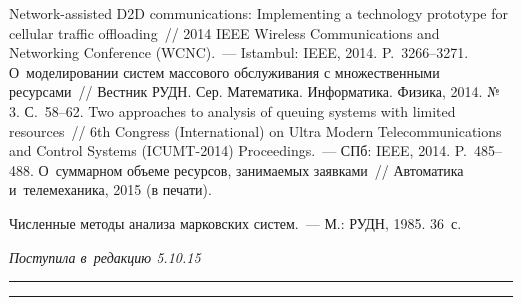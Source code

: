 \begin{multicols}{2}
{{\begin{thebibliography}{9}
Network-assisted D2D communications: Implementing a technology prototype for 
cellular traffic offloading~// 2014 IEEE Wireless Communications and Networking 
Conference (WCNC).~--- Istambul: IEEE, 2014. P.~3266--3271.
 О~моделировании систем массового 
обслуживания с множественными ресурсами~// Вестник РУДН. Сер. 
Математика. Информатика. Физика, 2014. №\,3. С.~58--62.
 Two approaches to analysis of 
queuing systems with limited resources~// 6th Congress (International) on Ultra 
Modern Telecommunications and Control Systems (ICUMT-2014) Proceedings.~--- 
СПб: IEEE, 2014. P.~485--488.
 О~суммарном объеме 
ресурсов, занимаемых заявками~// Автоматика и~телемеханика, 2015 (в печати).

 Численные методы анализа марковских систем.~--- М.: РУДН, 1985. 
36~с.



 \end{thebibliography}

 }
 }

\end{multicols}

\vspace*{-12pt}

\hfill{\small\textit{Поступила в~редакцию 5.10.15}}

\vspace*{4pt}



\hrule

\vspace*{2pt}

\hrule

\vspace*{-4pt}

\def\tit{ON PERFORMANCE ANALYSIS OF~MODERN WIRELESS NETWORKS\\[-5pt]}

\def\titkol{On performance analysis of modern wireless networks}

\def\aut{O.\,G. Vikhrova$^1$, K.\,E. Samouylov$^1$, E.\,S.~Sopin$^1$, 
and~S.\,Ya.~Shorgin$^2$\\[-11pt]}

